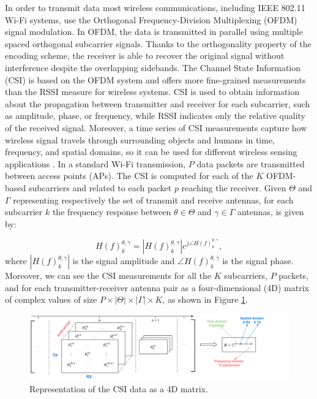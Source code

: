 \documentclass[binding=0.6cm,noexaminfo]{sapthesis}
\begin{document}
In order to transmit data most wireless communications, including IEEE 802.11 Wi-Fi systems, use the Orthogonal Frequency-Division Multiplexing (OFDM) signal modulation. In OFDM, the data is transmitted in parallel using multiple spaced orthogonal subcarrier signals. Thanks to the orthogonality property of the encoding scheme, the receiver is able to recover the original signal without interference despite the overlapping sidebands.
The Channel State Information (CSI) is based on the OFDM system and offers  more fine-grained measurements than the RSSI measure for wireless systems. CSI is used to obtain information about the propagation between transmitter and receiver for each subcarrier, such as amplitude, phase, or frequency, while RSSI indicates only the relative quality of the received signal. Moreover, a time series of CSI measurements capture how wireless signal travels through surrounding objects and humans in time, frequency, and spatial domains, so it can be used for different wireless sensing applications \cite{wifi-sensing-survey}.
In a standard Wi-Fi transmission, $P$ data packets are transmitted between access points (APs). The CSI is computed for each of the $K$ OFDM-based subcarriers and related to each packet $p$ reaching the receiver.
Given $\Theta$ and $\Gamma$ representing respectively the set of transmit and receive antennas, for each subcarrier $k$ the frequency response between $\theta \in \Theta$ and $\gamma \in \Gamma$ antennas, is given by:

\begin{equation}
H(f)^{\theta, \gamma}_k = |H(f)^{\theta, \gamma}_k| e^{j \angle H(f)^{\theta, \gamma}_k},
\label{eq:h(f)}
\end{equation}
where $|H(f)^{\theta, \gamma}_k|$ is the signal amplitude and $\angle H(f)^{\theta, \gamma}_k$ is the signal phase.
Moreover, we can see the CSI measurements for all the $K$ subcarriers, $P$ packets, and for each transmitter-receiver antenna pair as a four-dimensional (4D) matrix of complex values of size $P \times |\Theta| \times |\Gamma| \times K$, as shown in Figure \ref{fig:csi-4d}.

\begin{figure}[h!]
\centering
\includegraphics[width=\linewidth]{csi-matrix-2}
\caption{Representation of the CSI data as a 4D matrix.}
\label{fig:csi-4d}
\end{figure}
\end{document}
